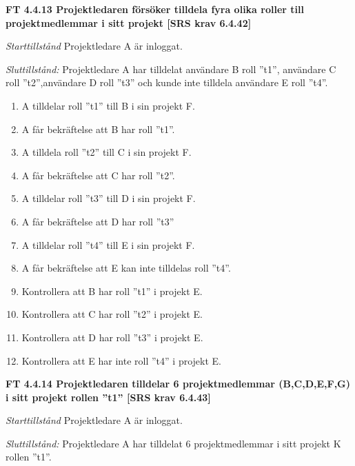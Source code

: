\documentclass[a4paper]{article}
\begin{document}
\textbf{FT 4.4.13 Projektledaren försöker tilldela fyra olika roller till projektmedlemmar i sitt projekt [SRS krav 6.4.42]}

\emph{Starttillstånd} Projektledare A är inloggat.

\emph{Sluttillstånd:} Projektledare A  har tilldelat användare B roll ”t1”, användare C roll ”t2”,användare D roll ”t3” och kunde inte tilldela användare E roll ”t4”.

\begin{enumerate}
\item A tilldelar roll ”t1” till B i sin projekt F.
\item A får bekräftelse att  B har roll ”t1”.
\item A tilldela roll ”t2” till C i sin projekt F.
\item A får bekräftelse att C har roll ”t2”.
\item A tilldelar roll ”t3” till D i sin projekt F.
\item A får bekräftelse att D har roll ”t3”
\item A tilldelar roll ”t4” till E i sin projekt F.
\item A får bekräftelse att E kan inte tilldelas roll ”t4”.
\item Kontrollera att B har roll ”t1” i projekt E.
\item Kontrollera att C har roll ”t2” i projekt E.
\item Kontrollera att D har roll ”t3” i projekt E.
\item Kontrollera att E har inte roll ”t4” i projekt E.
\end{enumerate}

\textbf{FT 4.4.14 Projektledaren tilldelar 6 projektmedlemmar (B,C,D,E,F,G) i sitt projekt rollen ''t1'' [SRS krav 6.4.43]}

\emph{Starttillstånd} Projektledare A är inloggat.

\emph{Sluttillstånd:} Projektledare A  har tilldelat 6 projektmedlemmar i sitt projekt K  rollen ''t1''.
\end{document}
